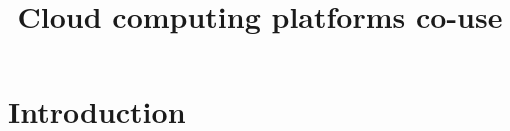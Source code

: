 \documentclass{article}
\title{Cloud computing platforms co-use}
\author{ }
\begin{document}
\maketitle

\section{Introduction}
%



%
\end{document}
